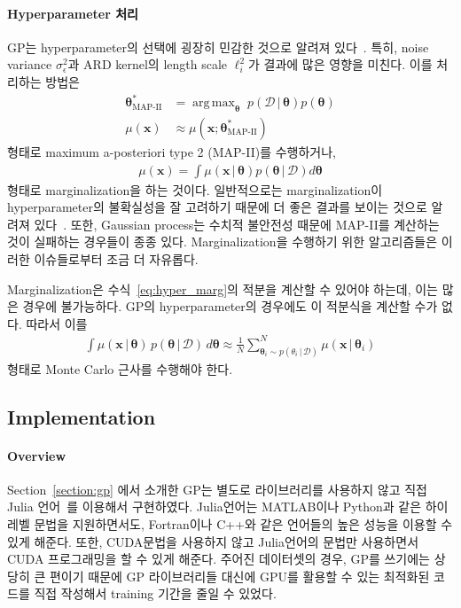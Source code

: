 \documentclass[ba]{imsart}
\newcommand{\vx}{\mathbf{x}}
\newcommand{\vtheta}{\pmb{\theta}}
\DeclareMathOperator*{\argmax}{arg\,max}
\begin{document}
\paragraph{Hyperparameter 처리}
GP는 hyperparameter의 선택에 굉장히 민감한 것으로 알려져 있다~\citep{rasmussen_gaussian_2006}.
특히, noise variance \(\sigma^2_{\epsilon}\)과 ARD kernel의 length scale \(\ell_i^2\)가 결과에 많은 영향을 미친다.
이를 처리하는 방법은  
\begin{align}
  \vtheta^*_{\text{MAP-II}} &= \argmax_{\vtheta}\; p(\mathcal{D} \,|\, \vtheta) p(\vtheta) \\
  \mu(\vx) &\approx \mu(\vx;  \vtheta^*_{\text{MAP-II}})
\end{align}
형태로 maximum a-posteriori type 2 (MAP-II)를 수행하거나, 
\begin{align}
  \mu(\vx) = \int \mu(\vx \,|\, \vtheta) p(\vtheta \,|\, \mathcal{D}) d\vtheta\label{eq:hyper_marg}
\end{align}
형태로 marginalization을 하는 것이다.
일반적으로는 marginalization이 hyperparameter의 불확실성을 잘 고려하기 때문에 더 좋은 결과를 보이는 것으로 알려져 있다~\cite{murphy_machine_2012}.
또한, Gaussian process는 수치적 불안전성 때문에 MAP-II를 계산하는 것이 실패하는 경우들이 종종 있다.
Marginalization을 수행하기 위한 알고리즘들은 이러한 이슈들로부터 조금 더 자유롭다.

Marginalization은 수식~\eqref{eq:hyper_marg}의 적분을 계산할 수 있어야 하는데, 이는 많은 경우에 불가능하다.
GP의 hyperparameter의 경우에도 이 적분식을 계산할 수가 없다.
따라서 이를 
\begin{align}
  \int \mu(\vx \,|\, \vtheta) \, p(\vtheta \,|\, \mathcal{D}) \, d\vtheta \approx \frac{1}{N} \sum_{\vtheta_i \sim p(\theta_i \,|\, \mathcal{D})}^N \mu(\vx \,|\, \vtheta_i) \label{eq:mc}
\end{align}
형태로 Monte Carlo 근사를 수행해야 한다.

\subsection{Implementation}\label{}
\paragraph{Overview}
Section~\ref{section:gp} 에서 소개한 GP는 별도로 라이브러리를 사용하지 않고 직접 Julia 언어~\citep{bezanson_julia_2017}를 이용해서 구현하였다.
Julia언어는 MATLAB이나 Python과 같은 하이레벨 문법을 지원하면서도, Fortran이나 C++와 같은 언어들의 높은 성능을 이용할 수 있게 해준다.
또한, CUDA문법을 사용하지 않고 Julia언어의 문법만 사용하면서 CUDA 프로그래밍을 할 수 있게 해준다.
주어진 데이터셋의 경우, GP를 쓰기에는 상당히 큰 편이기 때문에 GP 라이브러리들 대신에 GPU를 활용할 수 있는 최적화된 코드를 직접 작성해서 training 기간을 줄일 수 있었다.
\end{document}
